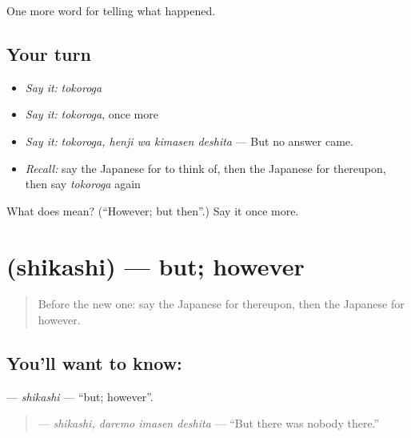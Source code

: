 \begin{grammarlens}[title={What you've built}]
One more word for telling what happened.
\end{grammarlens}

\subsection*{Your turn}
\begin{itemize}
\raggedright
  \item \emph{Say it:} \emph{tokoroga}
  \item \emph{Say it:} \emph{tokoroga}, once more
  \item \emph{Say it:} \emph{tokoroga, henji wa kimasen deshita} — But no answer came.
  \item \emph{Recall:} say the Japanese for to think of, then the Japanese for thereupon, then say \emph{tokoroga} again
\end{itemize}

\begin{tcolorbox}[breakable,colback=teal!4,colframe=teal!35!black,title={Before you move on}]
What does  mean? (\textquotedblleft{}However; but then\textquotedblright{}.) Say it once more.
\end{tcolorbox}
\section[\texorpdfstring{\ja{しかし} (shikashi)}{しかし (shikashi)}]{ (shikashi) — but; however}

\label{lesson:JA-C315-shikashi}



\begin{quote}
Before the new one: say the Japanese for thereupon, then the Japanese for however.
\end{quote}

\subsection*{You'll want to know: }
\textbf{} — \emph{shikashi} — \textquotedblleft{}but; however\textquotedblright{}.

\begin{quote}
\textbf{ } — \emph{shikashi, daremo imasen deshita} — \textquotedblleft{}But there was nobody there.\textquotedblright{}
\end{quote}

